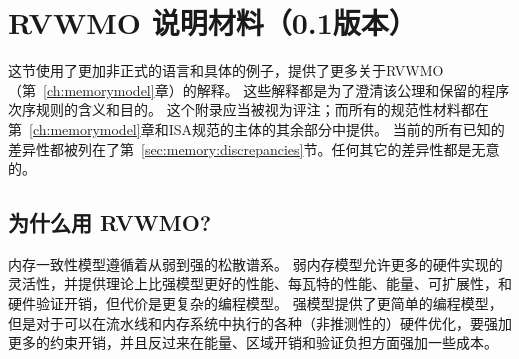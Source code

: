 \makeatletter
\gdef\SetFigFont#1#2#3#4#5{%
  \reset@font\fontsize{12}{#2pt}%
  \fontfamily{\sfdefault}\fontseries{#4}\fontshape{#5}%
  \selectfont}
\makeatother

\chapter{RVWMO 说明材料（0.1版本）}
\label{sec:memorymodelexplanation}
这节使用了更加非正式的语言和具体的例子，提供了更多关于RVWMO（第~\ref{ch:memorymodel}章）的解释。
这些解释都是为了澄清该公理和保留的程序次序规则的含义和目的。
这个附录应当被视为评注；而所有的规范性材料都在第~\ref{ch:memorymodel}章和ISA规范的主体的其余部分中提供。
当前的所有已知的差异性都被列在了第~\ref{sec:memory:discrepancies}节。任何其它的差异性都是无意的。

\section{为什么用 RVWMO?}
\label{sec:whyrvwmo}

内存一致性模型遵循着从弱到强的松散谱系。
弱内存模型允许更多的硬件实现的灵活性，并提供理论上比强模型更好的性能、每瓦特的性能、能量、可扩展性，和硬件验证开销，但代价是更复杂的编程模型。
强模型提供了更简单的编程模型，但是对于可以在流水线和内存系统中执行的各种（非推测性的）硬件优化，要强加更多的约束开销，并且反过来在能量、区域开销和验证负担方面强加一些成本。

